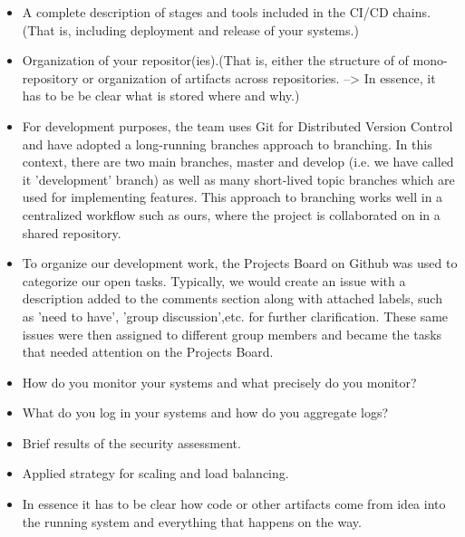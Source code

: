   
  \begin{itemize}
  \item A complete description of stages and tools included in the CI/CD chains.(That is, including deployment and release of your systems.)
  \item Organization of your repositor(ies).(That is, either the structure of of mono-repository or organization of artifacts across repositories. --> In essence, it has to be be clear what is stored where and why.) 
  \item For development purposes, the team uses Git for Distributed Version Control and have adopted a long-running branches approach to branching. In this context, there are two main branches, master and develop 
  (i.e. we have called it 'development' branch) as well as many short-lived topic branches which are used for implementing features. This approach to branching works well in a centralized workflow such as ours, where the project is collaborated on in a shared
  repository.
  \item To organize our development work, the Projects Board on Github was used to categorize our open tasks. Typically, we would create an issue with a description added to the comments section along
  with attached labels, such as 'need to have', 'group discussion',etc. for further clarification. These same issues were then assigned to different group members and became the tasks that needed attention on the Projects Board.
  
  \item How do you monitor your systems and what precisely do you monitor?
  \item What do you log in your systems and how do you aggregate logs?
  \item Brief results of the security assessment.
  \item Applied strategy for scaling and load balancing.
  \item In essence it has to be clear how code or other artifacts come from idea into the running system and everything that happens on the way.
  
\end{itemize}